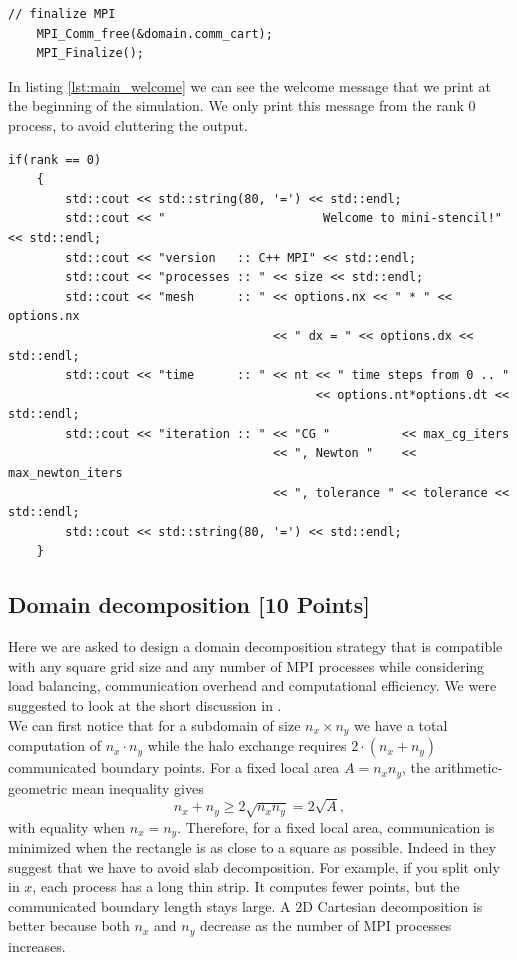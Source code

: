 \documentclass[unicode,10pt,a4paper,oneside,numbers=endperiod,openany]{scrartcl}
\begin{document}
\begin{lstlisting}[style=grayverbatim,label={lst:main_finalize},caption={Finalization of MPI}]
    // finalize MPI
    MPI_Comm_free(&domain.comm_cart);
    MPI_Finalize();
\end{lstlisting}
In listing \ref{lst:main_welcome} we can see the welcome message that we print at the beginning of the simulation. We only print this message from the rank 0 process, to avoid cluttering the output.
\begin{lstlisting}[style=grayverbatim,label={lst:main_welcome},caption={Welcome message}]
if(rank == 0)
    {
        std::cout << std::string(80, '=') << std::endl;
        std::cout << "                      Welcome to mini-stencil!" << std::endl;
        std::cout << "version   :: C++ MPI" << std::endl;
        std::cout << "processes :: " << size << std::endl;
        std::cout << "mesh      :: " << options.nx << " * " << options.nx
                                     << " dx = " << options.dx << std::endl;
        std::cout << "time      :: " << nt << " time steps from 0 .. "
                                           << options.nt*options.dt << std::endl;
        std::cout << "iteration :: " << "CG "          << max_cg_iters
                                     << ", Newton "    << max_newton_iters
                                     << ", tolerance " << tolerance << std::endl;
        std::cout << std::string(80, '=') << std::endl;
    }
\end{lstlisting}

\subsection{Domain decomposition [10 Points]}
Here we are asked to design a domain decomposition strategy that is compatible with any square grid size and any number of MPI processes while considering load balancing, communication overhead and computational efficiency. We were suggested to look at the short discussion in \cite[Sec. 10.4.1]{hager2010hpc}.\\
We can first notice that for a subdomain of size $n_x \times n_y$ we have a total computation of $n_x \cdot n_y$ while the halo exchange requires $2 \cdot (n_x + n_y)$ communicated boundary points. For a fixed local area $A = n_x n_y$, the arithmetic-geometric mean inequality gives
\[
n_x + n_y \ge 2\sqrt{n_x n_y} = 2\sqrt{A},
\]
with equality when $n_x = n_y$. Therefore, for a fixed local area, communication is minimized when the rectangle is as close to a square as possible. Indeed in \cite[Sec. 10.4.1]{hager2010hpc} they suggest that we have to avoid slab decomposition. For example, if you split only in $x$, each process has a long thin strip. It computes fewer points, but the communicated boundary length stays large. A 2D Cartesian decomposition is better because both $n_x$ and $n_y$ decrease as the number of MPI processes increases.
\end{document}
